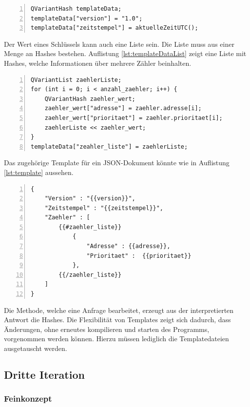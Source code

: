 \documentclass{article}
\begin{document}
\lstset{language=C++}
\begin{lstlisting}[caption=Antwortdokument schreiben, label=lst:templateData, frame=single, numbers=left, tabsize=3, captionpos=b]
QVariantHash templateData;
templateData["version"] = "1.0";
templateData["zeitstempel"] = aktuelleZeitUTC();
\end{lstlisting}

Der Wert eines Schlüssels kann auch eine Liste sein. Die Liste muss aus einer Menge an Hashes bestehen. Auflistung \ref{lst:templateDataList} zeigt eine Liste mit Hashes, welche Informationen über mehrere Zähler beinhalten.

\lstset{language=C++}
\begin{lstlisting}[caption=Antwortdokument schreiben, label=lst:templateDataList, frame=single, numbers=left, tabsize=3, captionpos=b]
QVariantList zaehlerListe;
for (int i = 0; i < anzahl_zaehler; i++) {
    QVariantHash zaehler_wert;
    zaehler_wert["adresse"] = zaehler.adresse[i];
    zaehler_wert["prioritaet"] = zaehler.prioritaet[i];
    zaehlerListe << zaehler_wert;
}
templateData["zeahler_liste"] = zaehlerListe;
\end{lstlisting}

Das zugehörige Template für ein JSON-Dokument könnte wie in Auflistung \ref{lst:template} aussehen.

\lstset{language=json}
\begin{lstlisting}[caption=Antwortdokument schreiben, label=lst:template, frame=single, numbers=left, tabsize=3, captionpos=b]
{
	"Version" : "{{version}}",
	"Zeitstempel" : "{{zeitstempel}}",
	"Zaehler" : [ 
		{{#zaehler_liste}} 
			{ 
				"Adresse" : {{adresse}},
				"Prioritaet" :  {{prioritaet}}
			},
		{{/zaehler_liste}}
	]
}
\end{lstlisting}

Die Methode, welche eine Anfrage bearbeitet, erzeugt aus der interpretierten Antwort die Hashes. Die Flexibilität von Templates zeigt sich dadurch, dass Änderungen, ohne erneutes kompilieren und starten des Programms, vorgenommen werden können. Hierzu müssen lediglich die Templatedateien ausgetauscht werden.

\subsection{Dritte Iteration}

\subsubsection{Feinkonzept}
\end{document}

